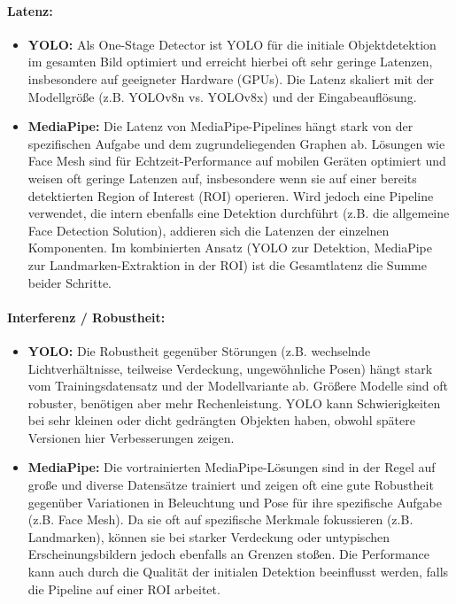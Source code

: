 \paragraph{Latenz:}
\begin{itemize}
    \item \textbf{YOLO:} Als One-Stage Detector ist YOLO für die initiale Objektdetektion im gesamten Bild optimiert und erreicht hierbei oft sehr geringe Latenzen, insbesondere auf geeigneter Hardware (GPUs). Die Latenz skaliert mit der Modellgröße (z.B. YOLOv8n vs. YOLOv8x) und der Eingabeauflösung.
    
    \item \textbf{MediaPipe:} Die Latenz von MediaPipe-Pipelines hängt stark von der spezifischen Aufgabe und dem zugrundeliegenden Graphen ab. Lösungen wie Face Mesh sind für Echtzeit-Performance auf mobilen Geräten optimiert und weisen oft geringe Latenzen auf, insbesondere wenn sie auf einer bereits detektierten Region of Interest (ROI) operieren. Wird jedoch eine Pipeline verwendet, die intern ebenfalls eine Detektion durchführt (z.B. die allgemeine Face Detection Solution), addieren sich die Latenzen der einzelnen Komponenten. Im kombinierten Ansatz (YOLO zur Detektion, MediaPipe zur Landmarken-Extraktion in der ROI) ist die Gesamtlatenz die Summe beider Schritte.
\end{itemize}

\paragraph{Interferenz / Robustheit:}
\begin{itemize}
    \item \textbf{YOLO:} Die Robustheit gegenüber Störungen (z.B. wechselnde Lichtverhältnisse, teilweise Verdeckung, ungewöhnliche Posen) hängt stark vom Trainingsdatensatz und der Modellvariante ab. Größere Modelle sind oft robuster, benötigen aber mehr Rechenleistung. YOLO kann Schwierigkeiten bei sehr kleinen oder dicht gedrängten Objekten haben, obwohl spätere Versionen hier Verbesserungen zeigen.
    
    \item \textbf{MediaPipe:} Die vortrainierten MediaPipe-Lösungen sind in der Regel auf große und diverse Datensätze trainiert und zeigen oft eine gute Robustheit gegenüber Variationen in Beleuchtung und Pose für ihre spezifische Aufgabe (z.B. Face Mesh). Da sie oft auf spezifische Merkmale fokussieren (z.B. Landmarken), können sie bei starker Verdeckung oder untypischen Erscheinungsbildern jedoch ebenfalls an Grenzen stoßen. Die Performance kann auch durch die Qualität der initialen Detektion beeinflusst werden, falls die Pipeline auf einer ROI arbeitet.
\end{itemize}

